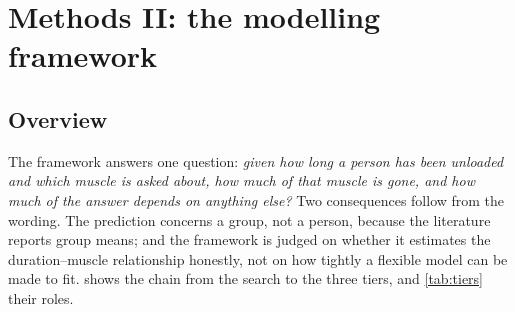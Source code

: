 \section{Methods II: the modelling framework}
\label{sec:methods-models}

\subsection{Overview}

The framework answers one question: \emph{given how long a person has been unloaded and which muscle is asked
about, how much of that muscle is gone, and how much of the answer depends on anything else?} Two consequences
follow from the wording. The prediction concerns a group, not a person, because the literature reports group
means; and the framework is judged on whether it estimates the duration--muscle relationship honestly, not on how
tightly a flexible model can be made to fit.  shows the chain from the search to the three
tiers, and \cref{tab:tiers} their roles.

